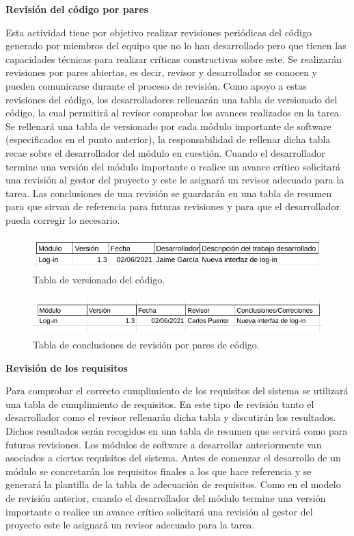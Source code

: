 \documentclass{article}
\begin{document}
\textbf{Revisión del código por pares}

Esta actividad tiene por objetivo realizar revisiones periódicas del código generado por miembros del equipo 
que no lo han desarrollado pero que tienen las capacidades técnicas para realizar críticas constructivas sobre este. 
Se realizarán revisiones por pares abiertas, es decir, revisor y desarrollador se conocen y pueden comunicarse durante 
el proceso de revisión.
Como apoyo a estas revisiones del código, los desarrolladores rellenarán una tabla de versionado del código, 
la cual permitirá al revisor comprobar los avances realizados en la tarea. Se rellenará una tabla de versionado por cada 
módulo importante de software (especificados en el punto anterior), la responsabilidad de rellenar dicha tabla recae sobre 
el desarrollador del módulo en cuestión.
Cuando el desarrollador termine una versión del módulo importante o realice un avance crítico solicitará una revisión 
al gestor del proyecto y este le asignará un revisor adecuado para la tarea. Las conclusiones de una revisión se guardarán 
en una tabla de resumen para que sirvan de referencia para futuras revisiones y para que el desarrollador pueda corregir lo necesario.

\begin{figure}[H]
    \centering
        \includegraphics[height=1.3cm]{../images/tabla_versionado_code.png}
    \caption{Tabla de versionado del código.}
    \label{tablaVersionado}
\end{figure}

\begin{figure}[H]
    \centering
        \includegraphics[height=1.5cm]{../images/tabla_conclusiones_revision_pares.png}
    \caption{Tabla de conclusiones de revisión por pares de código.}
    \label{tablaConclusionesPares}
\end{figure}

\textbf{Revisión de los requisitos}

Para comprobar el correcto cumplimiento de los requisitos del sistema se utilizará una tabla de cumplimiento de requisitos. 
En este tipo de revisión tanto el desarrollador como el revisor rellenarán dicha tabla y discutirán los resultados. 
Dichos resultados serán recogidos en una tabla de resumen que servirá como para futuras revisiones.
Los módulos de software a desarrollar anteriormente van asociados a ciertos requisitos del sistema. 
Antes de comenzar el desarrollo de un módulo se concretarán los requisitos finales a los que hace referencia 
y se generará la plantilla de la tabla de adecuación de requisitos.
Como en el modelo de revisión anterior, cuando el desarrollador del módulo termine una versión importante o 
realice un avance crítico solicitará una revisión al gestor del proyecto este le asignará un revisor adecuado para la tarea. 
\end{document}
